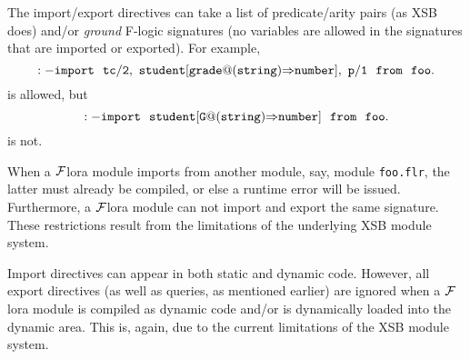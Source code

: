 \documentclass[11pt]{article}
\newcommand{\Fd}{\ensuremath{{\Rightarrow}}}                      %
\newcommand{\FLORA}{{\mbox{${\cal F}${\sc lora}}}\xspace}
\newcommand{\fl}{{F-logic}\xspace}
\begin{document}
The import/export directives can take a list of predicate/arity pairs (as
XSB does) and/or \emph{ground} \fl signatures (no variables are allowed in
the signatures that are imported or exported). For example,
\[
\tt
:- import ~~tc/2,~
student[grade@(string){\Fd}number],~ p/1~~from~~foo.
\]
is allowed, but 
\[
\tt
:- import ~~student[G@(string){\Fd}number]~~from~~foo.
\]
is not.

When a \FLORA module imports from another module, say, module {\tt foo.flr}, 
the latter must already be compiled, or else a runtime error will be
issued. Furthermore, a \FLORA module can not import and export the same
signature. These restrictions result from the limitations of the underlying
XSB module system.

Import directives can appear in both static and dynamic code. However, all
export directives (as well as queries, as mentioned earlier) are ignored
when a \FLORA module is compiled as dynamic code and/or is dynamically loaded
into the dynamic area. This is, again, due to the current limitations of
the XSB module system.
\end{document}
